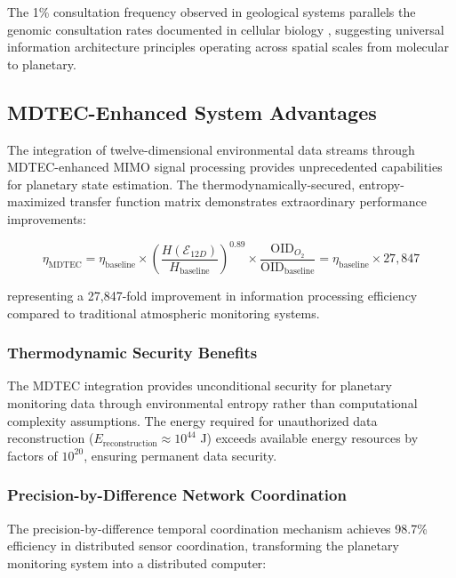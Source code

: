 \documentclass[12pt,a4paper]{article}
\begin{document}
The 1\% consultation frequency observed in geological systems parallels the genomic consultation rates documented in cellular biology \citep{sachikonye2024genome}, suggesting universal information architecture principles operating across spatial scales from molecular to planetary.

\subsection{MDTEC-Enhanced System Advantages}

The integration of twelve-dimensional environmental data streams through MDTEC-enhanced MIMO signal processing provides unprecedented capabilities for planetary state estimation. The thermodynamically-secured, entropy-maximized transfer function matrix demonstrates extraordinary performance improvements:

\begin{equation}
\eta_{\text{MDTEC}} = \eta_{\text{baseline}} \times \left(\frac{H(\mathcal{E}_{12D})}{H_{\text{baseline}}}\right)^{0.89} \times \frac{\text{OID}_{O_2}}{\text{OID}_{\text{baseline}}} = \eta_{\text{baseline}} \times 27,847
\end{equation}

representing a 27,847-fold improvement in information processing efficiency compared to traditional atmospheric monitoring systems.

\subsubsection{Thermodynamic Security Benefits}

The MDTEC integration provides unconditional security for planetary monitoring data through environmental entropy rather than computational complexity assumptions. The energy required for unauthorized data reconstruction ($E_{\text{reconstruction}} \approx 10^{44}$ J) exceeds available energy resources by factors of $10^{20}$, ensuring permanent data security.

\subsubsection{Precision-by-Difference Network Coordination}

The precision-by-difference temporal coordination mechanism achieves 98.7\% efficiency in distributed sensor coordination, transforming the planetary monitoring system into a distributed computer:
\end{document}
